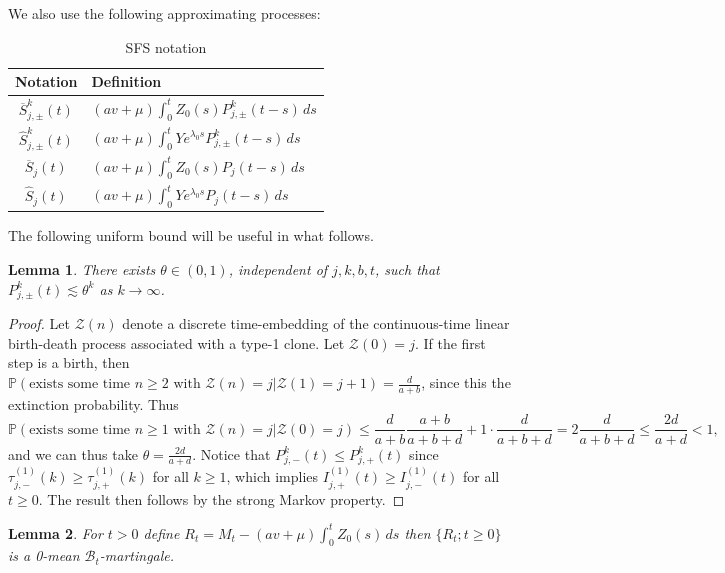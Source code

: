 \documentclass{article}
\numberwithin{equation}{section}
\newtheorem{lemma}{Lemma}
\begin{document}
We also use the following approximating processes:

\begin{table}[H]
  \centering
\begin{tabular}{|c|p{12cm}|}
\hline
\textbf{Notation} & \textbf{Definition} \\
\hline
$\overline{S}_{j,\pm}^{k}(t)$ & $(av+\mu)\int_0^t Z_0(s)P_{j,\pm}^k(t-s)\,ds$\\
$\widehat{S}_{j,\pm}^{k}(t)$ & $(av+\mu)\int_0^t Ye^{\lambda_0 s}P_{j,\pm}^k(t-s)\,ds$\\
$\overline{S}_j(t)$ & $(av+\mu)\int_0^t Z_0(s)P_{j}(t-s)\,ds$\\
$\widehat{S}_j(t)$ & $(av+\mu)\int_0^t Ye^{\lambda_0 s}P_{j}(t-s)\,ds$\\
\hline
\end{tabular}
\caption{SFS notation}\label{table:SFS_notation}
\end{table}

The following uniform bound will be useful in what follows.
\begin{lemma}\label{lem:uniform_bound_kth_entrance}
  There exists $\theta \in (0,1)$, independent of $j,k,b,t$, such that $P_{j,\pm}^k(t)\lesssim \theta^k$ as $k\to\infty$.\label{lem:P_j_pm_summable}
\end{lemma}
\begin{proof}
  Let $\mathcal{Z}(n)$ denote a discrete time-embedding of the continuous-time linear birth-death process associated with a type-1 clone. Let $\mathcal{Z}(0)=j$. If the first step is a birth, then $\mathbb{P}(\text{exists some time }n\geq 2\text{ with }\mathcal{Z}(n)=j|\mathcal{Z}(1)=j+1)=\frac{d}{a+b}$, since this the extinction probability. Thus 
\[  
\mathbb{P}(\text{exists some time }n\geq 1\text{ with }\mathcal{Z}(n)=j|\mathcal{Z}(0)=j)\leq \frac{d}{a+b}\frac{a+b}{a+b+d}+1\cdot \frac{d}{a+b+d}=2\frac{d}{a+b+d}\leq \frac{2d}{a+d}<1,
\]
and we can thus take $\theta=\frac{2d}{a+d}$. Notice that $P_{j,-}^k(t)\leq P_{j,+}^k(t)$ since $\tau_{j,-}^{(1)}(k)\geq \tau_{j,+}^{(1)}(k)$ for all $k\geq 1$, which implies $I_{j,+}^{(1)}(t)\geq I_{j,-}^{(1)}(t)$ for all $t\geq 0$. The result then follows by the strong Markov property.
\end{proof}

\begin{lemma}\label{lem:CenteredMuts_Martingale}
  For $t>0$ define $R_t=M_t-(av+\mu)\int_0^t Z_0(s)\,ds$ then $\{R_t;t\geq 0\}$ is a 0-mean $\mathcal{B}_t$-martingale. 
\end{lemma}
\end{document}
